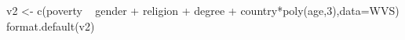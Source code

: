 \documentclass[
]{article}
\begin{document}
\begin{Schunk}
\begin{Sinput}
 v2 <- c(poverty ~ gender + religion + degree + country*poly(age,3),data=WVS)
 format.default(v2)
\end{Sinput}
\begin{Soutput}
                                                                                                                                                                                                                                                                                                                                                                                                                                                                                                                                                                                                                                                                                                                                                                                                                                                                                                                                                                                                                                                                                                                                                                                                                                                                                                                                                                                                                                                                                                                                                                                                                                                                                                                                                                                                                                                                                                                                                                                                                                                                                                                                                                                                                                                                                                                                                                                                                                                                                                                                                                                                                                                                                                                                                                                                                                                                                                                                                                                                                                                                                           
\end{Soutput}
\end{Schunk}
\end{document}

